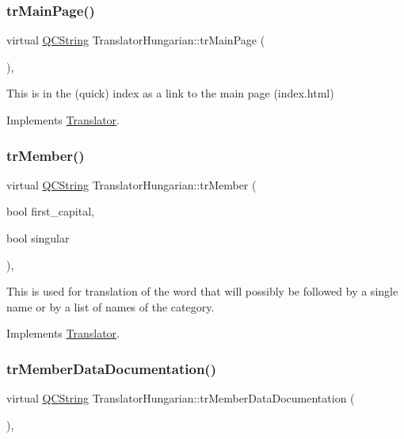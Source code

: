 \subsubsection{\texorpdfstring{trMainPage()}{trMainPage()}}
{\footnotesize\ttfamily virtual \mbox{\hyperlink{class_q_c_string}{Q\+C\+String}} Translator\+Hungarian\+::tr\+Main\+Page (\begin{DoxyParamCaption}{ }\end{DoxyParamCaption})\hspace{0.3cm}{\ttfamily [inline]}, {\ttfamily [virtual]}}

This is in the (quick) index as a link to the main page (index.\+html) 

Implements \mbox{\hyperlink{class_translator}{Translator}}.

\mbox{\label{class_translator_hungarian_aa0320fe2ae1c2608d35ac85e24e90a03}} 
\subsubsection{\texorpdfstring{trMember()}{trMember()}}
{\footnotesize\ttfamily virtual \mbox{\hyperlink{class_q_c_string}{Q\+C\+String}} Translator\+Hungarian\+::tr\+Member (\begin{DoxyParamCaption}\item[{bool}]{first\+\_\+capital,  }\item[{bool}]{singular }\end{DoxyParamCaption})\hspace{0.3cm}{\ttfamily [inline]}, {\ttfamily [virtual]}}

This is used for translation of the word that will possibly be followed by a single name or by a list of names of the category. 

Implements \mbox{\hyperlink{class_translator}{Translator}}.

\mbox{\label{class_translator_hungarian_a78a17359b90c459ae724f68af7be2552}} 
\subsubsection{\texorpdfstring{trMemberDataDocumentation()}{trMemberDataDocumentation()}}
{\footnotesize\ttfamily virtual \mbox{\hyperlink{class_q_c_string}{Q\+C\+String}} Translator\+Hungarian\+::tr\+Member\+Data\+Documentation (\begin{DoxyParamCaption}{ }\end{DoxyParamCaption})\hspace{0.3cm}{\ttfamily [inline]}, {\ttfamily [virtual]}}

